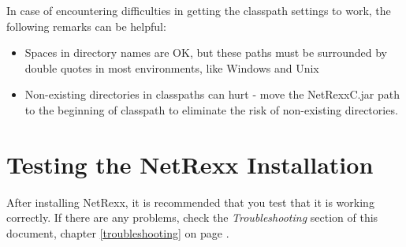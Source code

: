 In case of encountering difficulties in getting the classpath settings
to work, the following remarks can be helpful:
\begin{itemize}
\item Spaces in directory names are OK, but these paths must be
  surrounded by double quotes in most environments, like Windows and
  Unix
\item Non-existing directories in classpaths can hurt - move the
  NetRexxC.jar path to the beginning of classpath to eliminate the
  risk of non-existing directories.
\end{itemize}

\section{Testing the NetRexx Installation}\label{testing}
After installing NetRexx, it is recommended that you test that it is
working correctly. If there are any problems, check the
\emph{Troubleshooting} section of this document, chapter
\ref{troubleshooting} on page \pageref{troubleshooting}.

